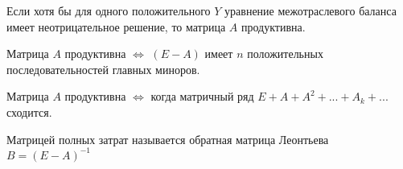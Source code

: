  \begin{definition}
   Если хотя бы для одного положительного $Y$ уравнение межотраслевого баланса имеет неотрицательное решение, то матрица $A$ продуктивна.
 \end{definition}
 \begin{definition}
  Матрица $A$ продуктивна $\iff$ $(E-A)$ имеет $n$ положительных последовательностей главных миноров.
 \end{definition}
 \begin{definition}
  Матрица $A$ продуктивна $\iff$ когда матричный ряд $E+A+A^2+...+A_k+...$ сходится.
 \end{definition}
 \begin{definition}
  Матрицей полных затрат называется обратная матрица Леонтьева $B=(E-A)^{-1}$
 \end{definition}


% 
